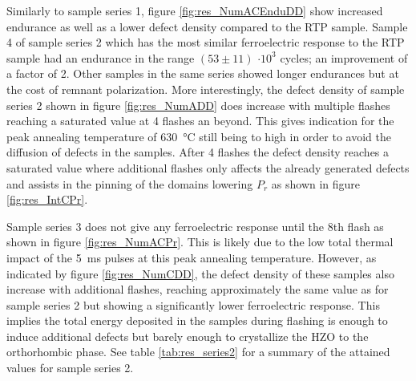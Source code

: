 \documentclass[11pt,twoside]{eitExjobb}
\begin{document}
Similarly to sample series 1, figure \ref{fig:res_NumACEnduDD} show increased
endurance as well as a lower defect density compared to the RTP sample. Sample 4
of sample series 2 which has the most similar ferroelectric response to the RTP
sample had an endurance in the range $(53 \pm 11)$ $\cdot 10^3$ cycles; an
improvement of a factor of 2. Other samples in the same series showed longer
endurances but at the cost of remnant polarization. More interestingly, the
defect density of sample series 2 shown in figure \ref{fig:res_NumADD} does
increase with multiple flashes reaching a saturated value at 4 flashes an
beyond. This gives indication for the peak annealing temperature of
\SI{630}{\celsius} still being to high in order to avoid the diffusion of
defects in the samples. After 4 flashes the defect density reaches a saturated
value where additional flashes only affects the already generated defects and
assists in the pinning of the domains lowering $P_r$ as shown in figure
\ref{fig:res_IntCPr}.

Sample series 3 does not give any ferroelectric response until the 8th flash as
shown in figure \ref{fig:res_NumACPr}. This is likely due to the low total
thermal impact of the \SI{5}{\milli\second} pulses at this peak annealing
temperature. However, as indicated by figure \ref{fig:res_NumCDD}, the defect
density of these samples also increase with additional flashes, reaching
approximately the same value as for sample series 2 but showing a significantly
lower ferroelectric response. This implies the total energy deposited in the
samples during flashing is enough to induce additional defects but barely enough
to crystallize the HZO to the orthorhombic phase. See table
\ref{tab:res_series2} for a summary of the attained values for sample series 2.
\end{document}
